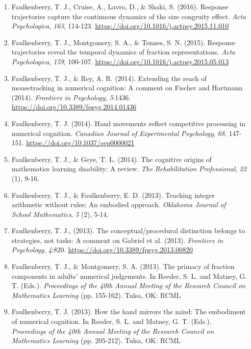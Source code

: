 \documentclass[article,10pt]{article}
\begin{document}
\begin{enumerate}
\item Faulkenberry, T. J., Cruise, A., Lavro, D., \& Shaki, S. (2016). Response trajectories capture the continuous dynamics of the size congruity effect. \emph{Acta Psychologica}, \emph{163}, 114-123. \url{https://doi.org/}\href{http://dx.doi.org/10.1016/j.actpsy.2015.11.010}{10.1016/j.actpsy.2015.11.010}
\item Faulkenberry, T. J., Montgomery, S. A., \& Tennes, S. N. (2015). Response trajectories reveal the temporal dynamics of fraction representations. \emph{Acta Psychologica}, \emph{159}, 100-107. \url{https://doi.org/}\href{http://dx.doi.org/10.1016/j.actpsy.2015.05.013}{10.1016/j.actpsy.2015.05.013}
\item Faulkenberry, T. J., \& Rey, A. R. (2014). Extending the reach of mousetracking in numerical cognition: A comment on Fischer and Hartmann (2014). \emph{Frontiers in Psychology}, \emph{5}:1436. \url{https://doi.org/}\href{http://dx.doi.org/10.3389/fpsyg.2014.01436}{10.3389/fpsyg.2014.01436}
\item Faulkenberry, T. J. (2014). Hand movements reflect competitive processing in numerical cognition. \emph{Canadian Journal of Experimental Psychology}, \emph{68}, 147-151. \url{https://doi.org/}\href{http://dx.doi.org/10.1037/cep0000021}{10.1037/cep0000021}
\item Faulkenberry, T. J., \& Geye, T. L. (2014). The cognitive origins of mathematics learning disability: A review. \emph{The Rehabilitation Professional}, \emph{22} (1), 9-16.
\item Faulkenberry, T. J., \& Faulkenberry, E. D. (2013). Teaching integer arithmetic without rules: An embodied approach. \emph{Oklahoma Journal of School Mathematics}, \emph{5} (2), 5-14.
\item Faulkenberry, T. J., (2013). The conceptual/procedural distinction belongs to strategies, not tasks: A comment on Gabriel et al. (2013). \emph{Frontiers in Psychology}, \emph{4}:820. \url{https://doi.org/}\href{http://dx.doi.org/10.3389/fpsyg.2013.00820}{10.3389/fpsyg.2013.00820}
\item Faulkenberry, T. J., \& Montgomery, S. A. (2013). The primacy of fraction components in adults’ numerical judgements. In Reeder, S. L. and Matney, G. T. (Eds.). \emph{Proceedings of the 40th Annual Meeting of the Research Council on Mathematics Learning} (pp. 155-162). Tulsa, OK: RCML
\item Faulkenberry, T. J. (2013). How the hand mirrors the mind: The embodiment of numerical cognition. In Reeder, S. L. and Matney, G. T. (Eds.). \emph{Proceedings of the 40th Annual Meeting of the Research Council on Mathematics Learning} (pp. 205-212). Tulsa, OK: RCML

\end{enumerate}
\end{document}
